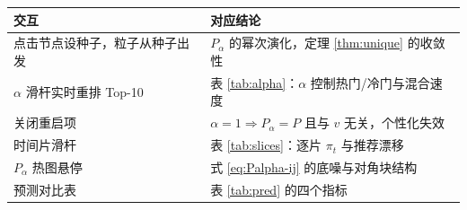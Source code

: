 \documentclass[12pt,a4paper]{ctexart}
\begin{document}
\begin{table}[H]
\centering
\small
\begin{tabular}{p{}p{}}
\toprule
交互 & 对应结论 \\
\midrule
点击节点设种子，粒子从种子出发 & $P_{\alpha}$ 的幂次演化，定理 \ref{thm:unique} 的收敛性 \\
$\alpha$ 滑杆实时重排 Top-10 & 表 \ref{tab:alpha}：$\alpha$ 控制热门/冷门与混合速度 \\
关闭重启项 & $\alpha=1\Rightarrow P_{\alpha}=P$ 且与 $v$ 无关，个性化失效 \\
时间片滑杆 & 表 \ref{tab:slices}：逐片 $\pi_t$ 与推荐漂移 \\
$P_{\alpha}$ 热图悬停 & 式 \eqref{eq:Palpha-ij} 的底噪与对角块结构 \\
预测对比表 & 表 \ref{tab:pred} 的四个指标 \\
\bottomrule
\end{tabular}
\end{table}
\end{document}
